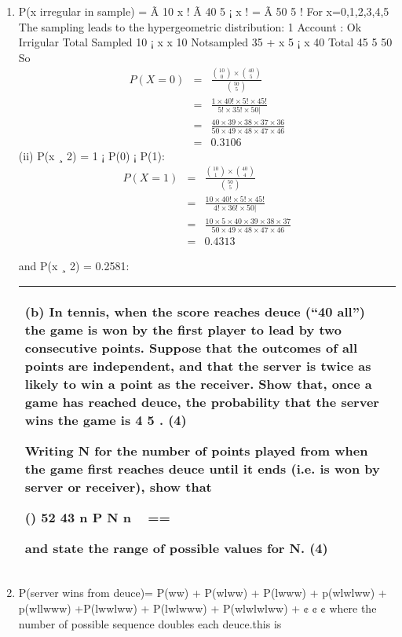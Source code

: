\documentclass[a4paper,12pt]{article}
\begin{document}
\begin{enumerate}
\item P(x irregular in sample) =
Ã
10
x
! Ã
40
5 ¡ x
!
=
Ã
50
5
!
For x=0,1,2,3,4,5
The sampling leads to the hypergeometric distribution:
1
Account : Ok Irrigular Total
Sampled 10 ¡ x x 10
Notsampled 35 + x 5 ¡ x 40
Total 45 5 50
So
\begin{eqnarray*}
P(X=0) &=& \frac{ {10 \choose 0} \times {40 \choose 5} }{ {50 \choose 5}}\\
&=& \frac{1 \times 40! \times 5!  \times 45!}{5! \times 35! \times 50|}\\
&=& \frac{ 40 \times 39 \times 38 \times 37 \times 36}{50 \times 49 \times 48 \times 47 \times 46}\\
&=& 0.3106
\end{eqnarray*}
(ii)
P(x ¸ 2) = 1 ¡ P(0) ¡ P(1):
\begin{eqnarray*}
P(X=1) &=& \frac{ {10 \choose 1} \times {40 \choose 4} }{ {50 \choose 5}}\\
&=& \frac{10 \times 40! \times 5!  \times 45!}{4! \times 36! \times 50|}\\
&=& \frac{10 \times 5 \times 40 \times 39 \times 38 \times 37}{50 \times 49 \times 48 \times 47 \times 46}\\
&=& 0.4313
\end{eqnarray*}


and P(x ¸ 2) = 0.2581:
\newpage

\begin{table}[ht!]
     \centering
     \begin{tabular}{|p{15cm}|}
     \hline  
(b) In tennis, when the score reaches deuce (“40 all”) the game is won by the first player to lead by two consecutive points.  Suppose that the outcomes of all points are independent, and that the server is twice as likely to win a point as the receiver.  Show that, once a game has reached deuce, the probability that the server wins the game is 4 5 . (4) 
 
Writing N for the number of points played from when the game first reaches deuce until it ends (i.e. is won by server or receiver), show that 
 
() 52 43 n P N n  == 
 
 
 
and state the range of possible values for N. 
(4) 
 
 
 \\ \hline
      \end{tabular}
    \end{table}
\item P(server wins from deuce)=
P(ww) + P(wlww) + P(lwww) + p(wlwlww) + p(wllwww)
+P(lwwlww) + P(lwlwww) + P(wlwlwlww) + ¢ ¢ ¢
where the number of possible sequence doubles each deuce.this is



\end{enumerate}
\end{document}
